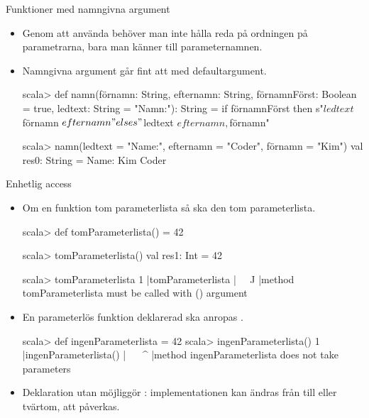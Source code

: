 \begin{Slide}{Funktioner med namngivna argument}
\begin{itemize}
\item Genom att använda  behöver man inte hålla reda på ordningen på parametrarna, bara man känner till parameternamnen.
\item Namngivna argument går fint att  med defaultargument.
\begin{REPLnonum}[basicstyle=\SlideFontSize{7}{9}\ttfamily\color{white}]
scala> def namn(förnamn: String,
                efternamn: String,
                förnamnFörst: Boolean = true,
                ledtext: String = "Namn:"): String =
         if förnamnFörst then s"$ledtext $förnamn $efternamn"
         else s"$ledtext $efternamn, $förnamn"

scala> namn(ledtext = "Name:", efternamn = "Coder", förnamn = "Kim")
val res0: String = Name: Kim Coder
\end{REPLnonum}
\end{itemize}
\end{Slide}


\begin{Slide}{Enhetlig access}\SlideFontSmall
\begin{itemize}
\item Om en funktion   tom parameterlista \code{()} så ska den   tom parameterlista.
\begin{REPLsmall}
scala> def tomParameterlista() = 42

scala> tomParameterlista()
val res1: Int = 42

scala> tomParameterlista                                                                                                                    
1 |tomParameterlista
  |^^^^^^^^^^^^^^^^^
  |method tomParameterlista must be called with () argument
\end{REPLsmall}

\item En parameterlös funktion deklarerad  \code{()} ska anropas  \code{()}. 
\begin{REPLsmall}
scala> def ingenParameterlista = 42
scala> ingenParameterlista()
1 |ingenParameterlista()
  |^^^^^^^^^^^^^^^^^^^
  |method ingenParameterlista does not take parameters
\end{REPLsmall}

\item Deklaration utan \code{()} möjliggör : implementationen kan ändras från  till  eller tvärtom,  att  påverkas.
\pause

\end{itemize}
\end{Slide}


